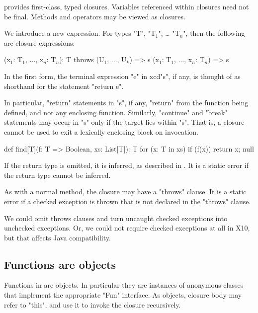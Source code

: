 \Xten{} provides first-class, typed closures.  Variables
referenced within closures need not be final.  Methods and
operators may be viewed as closures.

We introduce a new expression. For types \xcd"T",
\xcdmath"T$_1$", \dots
\xcdmath"T$_n$", then the following are closure expressions:

\begin{xtenmath}
(x$_1$: T$_1$, $\dots$, x$_n$: T$_n$): T throws (U$_1$, $\dots$, U$_k$) => { s }
(x$_1$: T$_1$, $\dots$, x$_n$: T$_n$) => { s }
\end{xtenmath}

In the first form, the terminal expression \xcd"e" in
xcd"s", if any, is thought of as shorthand for the statement
\xcd"return e". 

In particular, \xcd"return" statements in \xcd"s", if any,
\xcd"return" from the function
being defined, and not any enclosing function. Similarly,
\xcd"continue" and
\xcd"break" statements may occur in \xcd"s" only if the target
lies within \xcd"s". That
is, a closure cannot be used to exit a lexically enclosing block on
invocation.

\begin{example}
\begin{xten}
def find[T](f: T => Boolean, xs: List[T]): T {
  for (x: T in xs)
    if (f(x)) return x;
  null
}
\end{xten}
\end{example}

If the return type is omitted, it is inferred, as described in
.
It is a static error if the return type cannot be inferred.

As with a normal method, the closure may have a \xcd"throws" clause. It is a
static error if a checked exception is thrown that is not declared in
the \xcd"throws" clause.

\begin{note}
We could omit throws clauses and turn uncaught checked
exceptions into unchecked exceptions. Or, we could not require checked
exceptions at all in X10, but that affects Java compatibility.
\end{note}

\subsection{Functions are objects}

Functions in \Xten{} are objects.  In particular they are
instances of anonymous classes that implement the appropriate
\xcd"Fun" interface.  As objects, closure body may refer to
\xcd"this", and use it to invoke the closure recursively.


